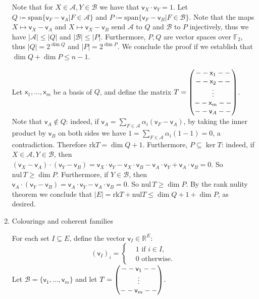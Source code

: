 \documentclass[kulak]{tplt}
\theoremstyle{definition}
\newcommand{\R}{\mathbb{R}}
\newcommand{\F}{\mathbb{F}}
\newcommand{\vv}{\mathsf{v}}
\newcommand{\vx}{\mathsf{x}}
\newcommand{\spn}{\mathrm{span}}
\newcommand{\rk}{\mathrm{rk}}
\newcommand{\nul}{\mathrm{nul}}
\begin{document}
\begin{enumerate}
Note that for $X \in \mathcal A,  Y \in \mathcal B$ we have that $\vv_X \cdot \vv_Y = 1$.
Let $Q \coloneqq \spn \{ \vv_F - \vv_A  | F \in \mathcal A \} $ and $P \coloneqq \spn \{ \vv_F - \vv_B  | F \in \mathcal B \} $.
Note that the maps $X \mapsto \vv_X - \vv_A$ and $X \mapsto \vv_X - \vv_B$ send $\mathcal A $ to $Q$ and $\mathcal B $ to $P$ injectively, thus we have $|\mathcal A| \leq |Q|$ and $|\mathcal B | \leq |P|$.
Furthermore, $P, Q$ are vector spaces over $\F_2$, thus $|Q| = 2^{\dim Q}$ and $|P| = 2^{\dim P}$.
We conclude the proof if we establish that $\dim Q + \dim P  \leq n - 1$.

Let $\vx_1, \ldots, \vx_m$ be a basis of $Q$, and define the matrix $T = \begin{pmatrix}
 \-- \-- \vx_1 \--\-- \\  \--\--  \vx_2 \-- \--\\ \vdots \\  \-- \-- \vx_m \--\-- \\  \--\--  \vv_A \--\--
\end{pmatrix}$.
Note that $\vv_A \not\in Q$: indeed, if $\vv_A = \sum_{F \in \mathcal A} \alpha_i (\vv_F - \vv_A)$, by taking the inner product by $\vv_B$ on both sides we have $1 = \sum_{F \in \mathcal A} \alpha_i (1 - 1) = 0$, a contradiction.
Therefore $\rk T = \dim Q + 1$.
Furthermore, $P \subseteq \ker T$: 
indeed, if $X \in \mathcal A,  Y \in \mathcal B$, then $(\vv_X - \vv_A)\cdot (\vv_Y - \vv_B) = \vv_X\cdot \vv_Y - \vv_X\cdot \vv_B - \vv_A\cdot \vv_Y + \vv_A\cdot \vv_B = 0$.
So $\nul\, T \geq \dim P$.
Furthermore, if $Y \in \mathcal B$, then $\vv_A\cdot (\vv_Y - \vv_B) = \vv_A\cdot \vv_Y - \vv_A\cdot \vv_B = 0$.
So $\nul\, T \geq \dim P$.
By the rank nulity theorem we conclude that $|E| = \rk T  + \nul T \leq \dim Q + 1 + \dim P$, as desired.


\item Colourings and coherent families

For each set $I \subseteq E$, define the vector $\vv_I \in \R^E$:
$$ (\vv_I)_i =\begin{cases*}
      & 1 \text{ if $i \in I$,}\\
      & 0 \text{ otherwise.}
    \end{cases*} $$
Let $\mathcal B = \{\vv_1, \ldots, \vv_m\}$ and let $T = \begin{pmatrix}
\-- \-- \vv_1 \-- \-- \\
\vdots \\
\-- \-- \vv_m \-- \-- 
\end{pmatrix}$.


\end{enumerate}
\end{document}
